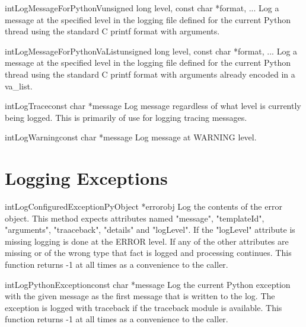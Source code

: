 \documentclass{manual}
\begin{document}
\begin{cfuncdesc}{int}{LogMessageForPythonV}{unsigned long level,
        const char *format, ...}
  Log a message at the specified level in the logging file defined for the
  current Python thread using the standard C printf format with arguments.
\end{cfuncdesc}

\begin{cfuncdesc}{int}{LogMessageForPythonVaList}{unsigned long level,
        const char *format, ...}
  Log a message at the specified level in the logging file defined for the
  current Python thread using the standard C printf format with arguments
  already encoded in a va_list.
\end{cfuncdesc}

\begin{cfuncdesc}{int}{LogTrace}{const char *message}
  Log message regardless of what level is currently being logged. This is
  primarily of use for logging tracing messages.
\end{cfuncdesc}

\begin{cfuncdesc}{int}{LogWarning}{const char *message}
  Log message at WARNING level.
\end{cfuncdesc}


\section{Logging Exceptions\label{cLoggingExceptions}}

\begin{cfuncdesc}{int}{LogConfiguredException}{PyObject *errorobj}
  Log the contents of the error object. This method expects attributes named
  "message", "templateId", "arguments", "traaceback", "details" and "logLevel".
  If the "logLevel" attribute is missing logging is done at the ERROR level.
  If any of the other attributes are missing or of the wrong type that fact is
  logged and processing continues. This function returns -1 at all times as a
  convenience to the caller.
\end{cfuncdesc}

\begin{cfuncdesc}{int}{LogPythonException}{const char *message}
  Log the current Python exception with the given message as the first message
  that is written to the log. The exception is logged with traceback if the
  traceback module is available. This function returns -1 at all times as a
  convenience to the caller.
\end{cfuncdesc}
\end{document}
